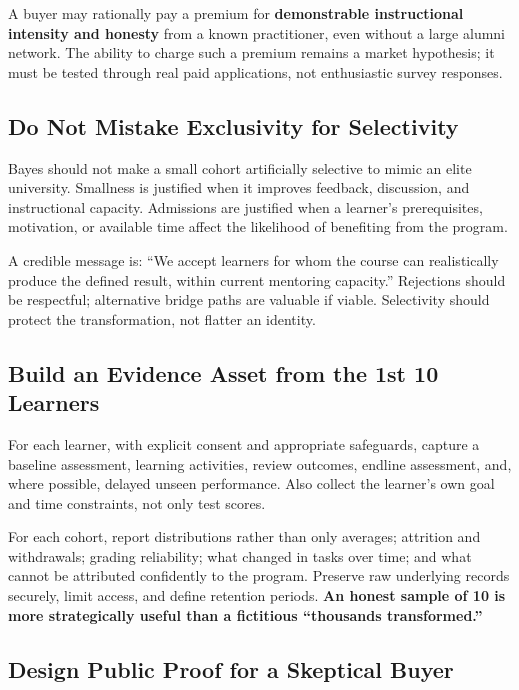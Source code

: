 A buyer may rationally pay a premium for \textbf{demonstrable instructional intensity and honesty} from a known practitioner, even without a large alumni network. The ability to charge such a premium remains a market hypothesis; it must be tested through real paid applications, not enthusiastic survey responses.

\subsection{Do Not Mistake Exclusivity for Selectivity}
\label{sec:dont_mistake_exclusivity_for_selectivity}

Bayes should not make a small cohort artificially selective to mimic an elite university. Smallness is justified when it improves feedback, discussion, and instructional capacity. Admissions are justified when a learner's prerequisites, motivation, or available time affect the likelihood of benefiting from the program.

A credible message is: ``We accept learners for whom the course can realistically produce the defined result, within current mentoring capacity.'' Rejections should be respectful; alternative bridge paths are valuable if viable. Selectivity should protect the transformation, not flatter an identity.

\subsection{Build an Evidence Asset from the 1st 10 Learners}
\label{sec:build_evidence_first_ten_learners}

For each learner, with explicit consent and appropriate safeguards, capture a baseline assessment, learning activities, review outcomes, endline assessment, and, where possible, delayed unseen performance. Also collect the learner's own goal and time constraints, not only test scores.

For each cohort, report distributions rather than only averages; attrition and withdrawals; grading reliability; what changed in tasks over time; and what cannot be attributed confidently to the program. Preserve raw underlying records securely, limit access, and define retention periods. \textbf{An honest sample of 10 is more strategically useful than a fictitious ``thousands transformed.''}

\subsection{Design Public Proof for a Skeptical Buyer}
\label{sec:design_public_proof_skeptical_buyer}

